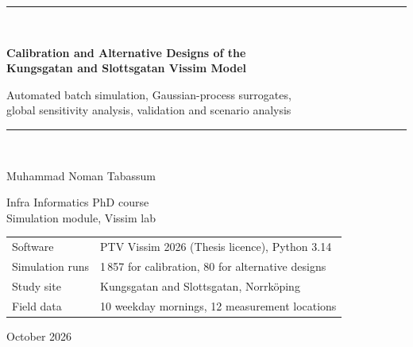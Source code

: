 \documentclass[11pt,a4paper]{article}
\begin{document}

\begin{titlepage}
\thispagestyle{empty}
\centering
\vspace*{2.2cm}
{\color{accent}\rule{\textwidth}{1.2pt}}\\[14pt]
{\LARGE\bfseries Calibration and Alternative Designs of the\\[4pt]
Kungsgatan and Slottsgatan Vissim Model\par}
\vspace{10pt}
{\large Automated batch simulation, Gaussian-process surrogates,\\
global sensitivity analysis, validation and scenario analysis\par}
\vspace{10pt}
{\color{accent}\rule{\textwidth}{1.2pt}}\\[2.2cm]

{\Large Muhammad Noman Tabassum\par}
\vspace{8pt}
{\large Infra Informatics PhD course\\Simulation module, Vissim lab\par}
\vfill

\begin{tabular}{@{}ll@{}}
\toprule
Software & PTV Vissim 2026 (Thesis licence), Python 3.14 \\
Simulation runs & 1\,857 for calibration, 80 for alternative designs \\
Study site & Kungsgatan and Slottsgatan, Norrk\"oping \\
Field data & 10 weekday mornings, 12 measurement locations \\
\bottomrule
\end{tabular}
\vspace{1.6cm}

{\large October 2026\par}
\end{titlepage}
\end{document}
